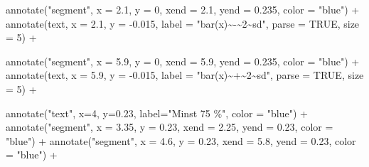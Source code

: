 \documentclass[
]{book}
\newenvironment{Shaded}{\begin{snugshade}}{\end{snugshade}}
\newcommand{\AttributeTok}[1]{\textcolor[rgb]{0.77,0.63,0.00}{#1}}
\newcommand{\ConstantTok}[1]{\textcolor[rgb]{0.00,0.00,0.00}{#1}}
\newcommand{\DecValTok}[1]{\textcolor[rgb]{0.00,0.00,0.81}{#1}}
\newcommand{\FloatTok}[1]{\textcolor[rgb]{0.00,0.00,0.81}{#1}}
\newcommand{\FunctionTok}[1]{\textcolor[rgb]{0.00,0.00,0.00}{#1}}
\newcommand{\NormalTok}[1]{#1}
\newcommand{\SpecialCharTok}[1]{\textcolor[rgb]{0.00,0.00,0.00}{#1}}
\newcommand{\StringTok}[1]{\textcolor[rgb]{0.31,0.60,0.02}{#1}}
\begin{document}
\begin{Shaded}
\begin{Highlighting}[]
  \FunctionTok{annotate}\NormalTok{(}\StringTok{"segment"}\NormalTok{, }\AttributeTok{x =} \FloatTok{2.1}\NormalTok{, }\AttributeTok{y =} \DecValTok{0}\NormalTok{, }\AttributeTok{xend =} \FloatTok{2.1}\NormalTok{, }\AttributeTok{yend =} \FloatTok{0.235}\NormalTok{, }\AttributeTok{color =} \StringTok{"blue"}\NormalTok{) }\SpecialCharTok{+} 
  \FunctionTok{annotate}\NormalTok{(}\StringTok{\textquotesingle{}text\textquotesingle{}}\NormalTok{, }\AttributeTok{x =} \FloatTok{2.1}\NormalTok{, }\AttributeTok{y =} \SpecialCharTok{{-}}\FloatTok{0.015}\NormalTok{, }\AttributeTok{label =} \StringTok{"bar(x)\textasciitilde{}{-}\textasciitilde{}2\textasciitilde{}sd"}\NormalTok{, }\AttributeTok{parse =} \ConstantTok{TRUE}\NormalTok{, }\AttributeTok{size =} \DecValTok{5}\NormalTok{) }\SpecialCharTok{+}
  
  \FunctionTok{annotate}\NormalTok{(}\StringTok{"segment"}\NormalTok{, }\AttributeTok{x =} \FloatTok{5.9}\NormalTok{, }\AttributeTok{y =} \DecValTok{0}\NormalTok{, }\AttributeTok{xend =} \FloatTok{5.9}\NormalTok{, }\AttributeTok{yend =} \FloatTok{0.235}\NormalTok{, }\AttributeTok{color =} \StringTok{"blue"}\NormalTok{) }\SpecialCharTok{+} 
  \FunctionTok{annotate}\NormalTok{(}\StringTok{\textquotesingle{}text\textquotesingle{}}\NormalTok{, }\AttributeTok{x =} \FloatTok{5.9}\NormalTok{, }\AttributeTok{y =} \SpecialCharTok{{-}}\FloatTok{0.015}\NormalTok{, }\AttributeTok{label =} \StringTok{"bar(x)\textasciitilde{}+\textasciitilde{}2\textasciitilde{}sd"}\NormalTok{, }\AttributeTok{parse =} \ConstantTok{TRUE}\NormalTok{, }\AttributeTok{size =} \DecValTok{5}\NormalTok{) }\SpecialCharTok{+}
  
  \FunctionTok{annotate}\NormalTok{(}\StringTok{"text"}\NormalTok{, }\AttributeTok{x=}\DecValTok{4}\NormalTok{, }\AttributeTok{y=}\FloatTok{0.23}\NormalTok{, }\AttributeTok{label=}\StringTok{"Minst 75 \%"}\NormalTok{, }\AttributeTok{color =} \StringTok{"blue"}\NormalTok{) }\SpecialCharTok{+}
  \FunctionTok{annotate}\NormalTok{(}\StringTok{"segment"}\NormalTok{, }\AttributeTok{x =} \FloatTok{3.35}\NormalTok{, }\AttributeTok{y =} \FloatTok{0.23}\NormalTok{, }\AttributeTok{xend =} \FloatTok{2.25}\NormalTok{, }\AttributeTok{yend =} \FloatTok{0.23}\NormalTok{, }\AttributeTok{color =} \StringTok{"blue"}\NormalTok{) }\SpecialCharTok{+} 
  \FunctionTok{annotate}\NormalTok{(}\StringTok{"segment"}\NormalTok{, }\AttributeTok{x =} \FloatTok{4.6}\NormalTok{, }\AttributeTok{y =} \FloatTok{0.23}\NormalTok{, }\AttributeTok{xend =} \FloatTok{5.8}\NormalTok{, }\AttributeTok{yend =} \FloatTok{0.23}\NormalTok{, }\AttributeTok{color =} \StringTok{"blue"}\NormalTok{) }\SpecialCharTok{+}
  

\end{Highlighting}
\end{Shaded}
\end{document}
